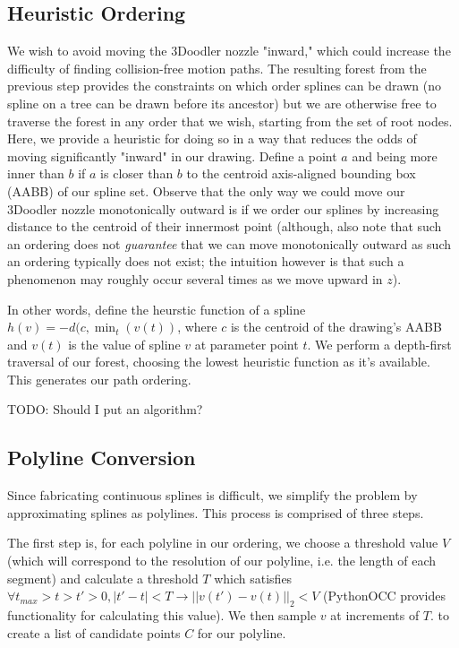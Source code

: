 \documentclass[conference]{acmsiggraph}
\begin{document}
\subsection{Heuristic Ordering}
We wish to avoid moving the 3Doodler nozzle "inward," which could increase the difficulty of finding collision-free motion paths.  The resulting forest from the previous step provides the constraints on which order splines can be drawn (no spline on a tree can be drawn before its ancestor) but we are otherwise free to traverse the forest in any order that we wish, starting from the set of root nodes.  Here, we provide a heuristic for doing so in a way that reduces the odds of moving significantly "inward" in our drawing.  Define a point $a$ and being more inner than $b$ if $a$ is closer than $b$ to the centroid axis-aligned bounding box (AABB) of our spline set.  Observe that the only way we could move our 3Doodler nozzle monotonically outward is if we order our splines by increasing distance to the centroid of their innermost point (although, also note that such an ordering does not \emph{guarantee} that we can move monotonically outward as such an ordering typically does not exist; the intuition however is that such a phenomenon may roughly occur several times as we move upward in $z$).

In other words, define the heurstic function of a spline $h(v) = -d(c, \min_t(v(t))$, where $c$ is the centroid of the drawing's AABB and $v(t)$ is the value of spline $v$ at parameter point $t$.  We perform a depth-first traversal of our forest, choosing the lowest heuristic function as it's available.  This generates our path ordering.

TODO: Should I put an algorithm?


\subsection{Polyline Conversion}
Since fabricating continuous splines is difficult, we simplify the problem by approximating splines as polylines.  This process is comprised of three steps.

The first step is, for each polyline in our ordering, we choose a threshold value $V$ (which will correspond to the resolution of our polyline, i.e. the length of each segment) and calculate a threshold $T$ which satisfies $\forall t_{max} > t > t' > 0, |t' - t| < T \rightarrow ||v(t') - v(t)||_2 < V$ (PythonOCC provides functionality for calculating this value).  We then sample $v$ at increments of $T$. to create a list of candidate points $C$ for our polyline.  
\end{document}
